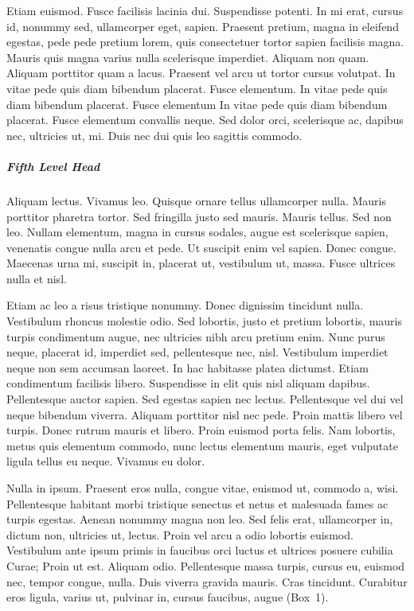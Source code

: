 \documentclass[ASNA,twocolumn]{USG} %
\begin{document}
{Etiam euismod. Fusce facilisis lacinia dui. Suspendisse potenti. In mi erat, cursus id, nonummy sed, ullamcorper
eget, sapien. Praesent pretium, magna in eleifend egestas, pede pede pretium lorem, quis consectetuer tortor sapien
facilisis magna. Mauris quis magna varius nulla scelerisque imperdiet. Aliquam non quam. Aliquam porttitor quam
a lacus. Praesent vel arcu ut tortor cursus volutpat. In vitae pede quis diam bibendum placerat. Fusce elementum.  In vitae pede quis diam bibendum placerat. Fusce elementum In vitae pede quis diam bibendum placerat. Fusce elementum
convallis neque. Sed dolor orci, scelerisque ac, dapibus nec, ultricies ut, mi. Duis nec dui quis leo sagittis commodo.

\subparagraph{Fifth Level Head}

Aliquam lectus. Vivamus leo. Quisque ornare tellus ullamcorper nulla. Mauris porttitor pharetra
tortor. Sed fringilla justo sed mauris. Mauris tellus. Sed non leo. Nullam elementum, magna in cursus sodales, augue
est scelerisque sapien, venenatis congue nulla arcu et pede. Ut suscipit enim vel sapien. Donec congue. Maecenas
urna mi, suscipit in, placerat ut, vestibulum ut, massa. Fusce ultrices nulla et nisl.

Etiam ac leo a risus tristique nonummy. Donec dignissim tincidunt nulla. Vestibulum rhoncus molestie odio. Sed
lobortis, justo et pretium lobortis, mauris turpis condimentum augue, nec ultricies nibh arcu pretium enim. Nunc
purus neque, placerat id, imperdiet sed, pellentesque nec, nisl. Vestibulum imperdiet neque non sem accumsan laoreet.
In hac habitasse platea dictumst. Etiam condimentum facilisis libero. Suspendisse in elit quis nisl aliquam dapibus.
Pellentesque auctor sapien. Sed egestas sapien nec lectus. Pellentesque vel dui vel neque bibendum viverra. Aliquam
porttitor nisl nec pede. Proin mattis libero vel turpis. Donec rutrum mauris et libero. Proin euismod porta felis.
Nam lobortis, metus quis elementum commodo, nunc lectus elementum mauris, eget vulputate ligula tellus eu neque.
Vivamus eu dolor.

Nulla in ipsum. Praesent eros nulla, congue vitae, euismod ut, commodo a, wisi. Pellentesque habitant morbi
tristique senectus et netus et malesuada fames ac turpis egestas. Aenean nonummy magna non leo. Sed felis erat,
ullamcorper in, dictum non, ultricies ut, lectus. Proin vel arcu a odio lobortis euismod. Vestibulum ante ipsum primis
in faucibus orci luctus et ultrices posuere cubilia Curae; Proin ut est. Aliquam odio. Pellentesque massa turpis, cursus
eu, euismod nec, tempor congue, nulla. Duis viverra gravida mauris. Cras tincidunt. Curabitur eros ligula, varius ut,
pulvinar in, cursus faucibus, augue (Box~1).


}
\end{document}
